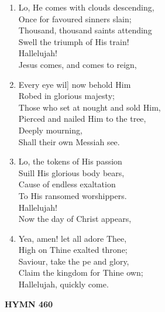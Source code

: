 \documentclass[11pt,a4paper]{article}
\begin{document}
\begin{enumerate}
    \item Lo, He comes with clouds descending, \\
        Once for favoured sinners slain; \\
        Thousand, thousand saints attending \\
        Swell the triumph of His train! \\
        Hallelujah! \\
        Jesus comes, and comes to reign,

    \item Every eye wil] now behold Him \\
        Robed in glorious majesty; \\
        Those who set at nought and sold Him, \\
        Pierced and nailed Him to the tree, \\
        Deeply mourning, \\
        Shall their own Messiah see.

    \item Lo, the tokens of His passion \\
        Suill His glorious body bears, \\
        Cause of endless exaltation \\
        To His ransomed worshippers. \\
        Hallelujah! \\
        Now the day of Christ appears,

    \item Yea, amen! let all adore Thee, \\
        High on Thine exalted throne; \\
        Saviour, take the pe and glory, \\
        Claim the kingdom for Thine own; \\
        Hallelujah, quickly come.

\end{enumerate}

\newpage
\begin{center}
    {\Large \textbf{HYMN 460}}
\end{center}
\vspace{1em}
\end{document}
